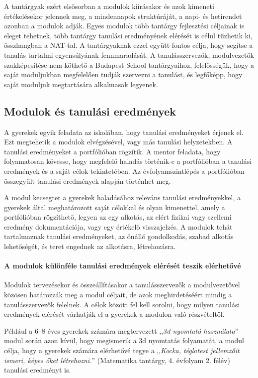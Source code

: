 A tantárgyak ezért elsősorban a modulok kiírásakor és azok kimeneti értékelésekor jelennek meg, a mindennapok struktúráját, a napi- és hetirendet azonban a modulok adják. Egyes modulok több tantárgy fejlesztési céljainak is eleget tehetnek, több tantárgy tanulási eredményének elérését is célul tűzhetik ki, összhangban a NAT-tal. A tantárgyaknak ezzel együtt fontos célja, hogy segítse a tanulás tartalmi egyensúlyának fennmaradását. A tanulásszervezők, modulvezetők szakképesítése nem köthető a Budapest School tantárgyaihoz, felelősségük, hogy a saját moduljukban megfelelően tudják szervezni a tanulást, és legfőképp, hogy saját moduljuk megtartására alkalmasak legyenek.

\subsection{Modulok és tanulási eredmények}
\label{sec:modulok_es_tanulasi_eredmenyek}
A gyerekek egyik feladata az iskolában, hogy tanulási eredményeket érjenek el. Ezt megtehetik a modulok elvégzésével, vagy más tanulási helyzetekben. A tanulási eredményeket a portfólióban rögzítik. A mentor feladata, hogy folyamatosan kövesse, hogy megfelelő haladás történik-e a portfólióban a tanulási eredmények és a saját célok tekintetében. Az évfolyamszintlépés a portfólióban összegyűlt tanulási eredmények alapján történhet meg.

A modul kecsegtet a gyerekek haladásához releváns tanulási eredményekkel, a gyerekek által meghatározott saját célokkal és olyan kimenettel, amely a portfólióban rögzíthető, legyen az egy alkotás, az elért fizikai vagy szellemi eredmény dokumentációja, vagy egy értékelő visszajelzés. A modulok tehát tartalmaznak tanulási eredményeket, az önálló gondolkodás, szabad alkotás lehetőségét, és teret engednek az alkotásra, létrehozásra.

\paragraph{A modulok különféle tanulási eredmények elérését teszik elérhetővé}

Modulok tervezésekor és összeállításakor a tanulásszervezők a modulvezetővel közösen határozzák meg a modul céljait, de azok meghirdetéséért mindig a tanulásszervezők felelnek. A célok között fel kell sorolni, hogy milyen tanulási eredmények elérését várhatják el a gyerekek a modulon való részvételtől.

Például a 6--8 éves gyerekek számára megtervezett ,,\emph{3d nyomtató használata}'' modul során azon kívül, hogy megismerik a 3d nyomtatás folyamatát, a modul célja, hogy a gyerekek számára elérhetővé tegye a ,,\emph{Kocka, téglatest jellemzőit ismeri, képes őket létrehozni.}'' (Matematika tantárgy, 4. évfolyam 2. félév) tanulási eredményt is.

